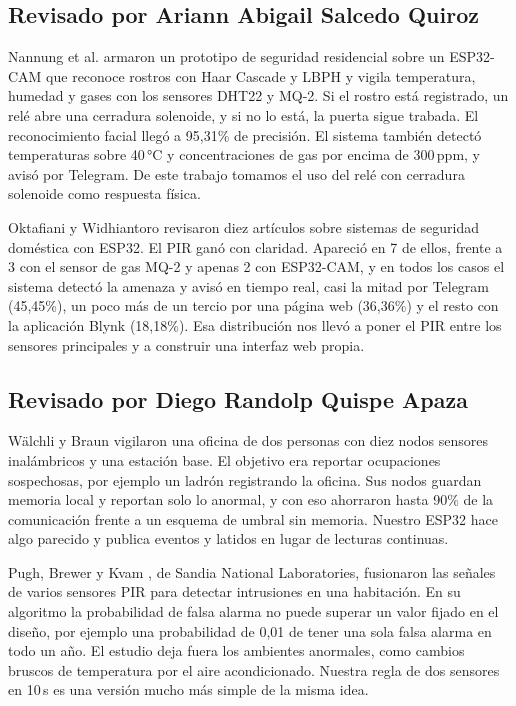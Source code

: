\documentclass[conference]{IEEEtran}
\begin{document}
\subsection{Revisado por Ariann Abigail Salcedo Quiroz}
Nannung et al. \cite{nannung2025iot} armaron un prototipo de seguridad residencial sobre un ESP32-CAM que reconoce rostros con Haar Cascade y LBPH y vigila temperatura, humedad y gases con los sensores DHT22 y MQ-2. Si el rostro está registrado, un relé abre una cerradura solenoide, y si no lo está, la puerta sigue trabada. El reconocimiento facial llegó a 95,31\% de precisión. El sistema también detectó temperaturas sobre 40\,°C y concentraciones de gas por encima de 300\,ppm, y avisó por Telegram. De este trabajo tomamos el uso del relé con cerradura solenoide como respuesta física.

Oktafiani y Widhiantoro \cite{oktafiani2025esp32} revisaron diez artículos sobre sistemas de seguridad doméstica con ESP32. El PIR ganó con claridad. Apareció en 7 de ellos, frente a 3 con el sensor de gas MQ-2 y apenas 2 con ESP32-CAM, y en todos los casos el sistema detectó la amenaza y avisó en tiempo real, casi la mitad por Telegram (45,45\%), un poco más de un tercio por una página web (36,36\%) y el resto con la aplicación Blynk (18,18\%). Esa distribución nos llevó a poner el PIR entre los sensores principales y a construir una interfaz web propia.

\subsection{Revisado por Diego Randolp Quispe Apaza}
Wälchli y Braun \cite{walchli2009building} vigilaron una oficina de dos personas con diez nodos sensores inalámbricos y una estación base. El objetivo era reportar ocupaciones sospechosas, por ejemplo un ladrón registrando la oficina. Sus nodos guardan memoria local y reportan solo lo anormal, y con eso ahorraron hasta 90\% de la comunicación frente a un esquema de umbral sin memoria. Nuestro ESP32 hace algo parecido y publica eventos y latidos en lugar de lecturas continuas.

Pugh, Brewer y Kvam \cite{pugh2015fusion}, de Sandia National Laboratories, fusionaron las señales de varios sensores PIR para detectar intrusiones en una habitación. En su algoritmo la probabilidad de falsa alarma no puede superar un valor fijado en el diseño, por ejemplo una probabilidad de 0,01 de tener una sola falsa alarma en todo un año. El estudio deja fuera los ambientes anormales, como cambios bruscos de temperatura por el aire acondicionado. Nuestra regla de dos sensores en 10\,s es una versión mucho más simple de la misma idea.
\end{document}
